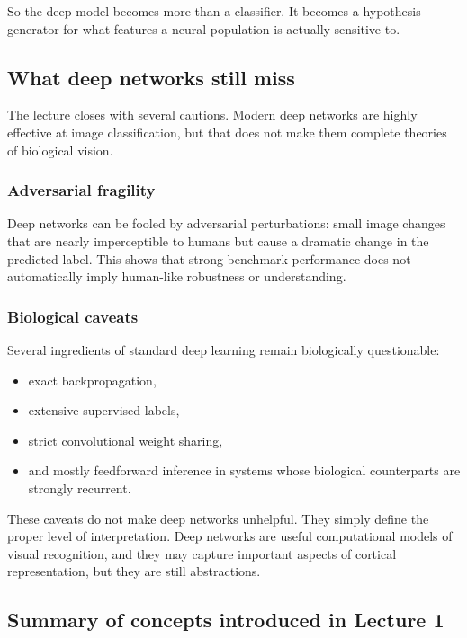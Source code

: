 So the deep model becomes more than a classifier. It becomes a hypothesis generator for what features a neural population is actually sensitive to.

\subsection{What deep networks still miss}

The lecture closes with several cautions. Modern deep networks are highly effective at image classification, but that does not make them complete theories of biological vision.

\subsubsection{Adversarial fragility}

Deep networks can be fooled by adversarial perturbations: small image changes that are nearly imperceptible to humans but cause a dramatic change in the predicted label. This shows that strong benchmark performance does not automatically imply human-like robustness or understanding.

\subsubsection{Biological caveats}

Several ingredients of standard deep learning remain biologically questionable:
\begin{itemize}
    \item exact backpropagation,
    \item extensive supervised labels,
    \item strict convolutional weight sharing,
    \item and mostly feedforward inference in systems whose biological counterparts are strongly recurrent.
\end{itemize}

These caveats do not make deep networks unhelpful. They simply define the proper level of interpretation. Deep networks are useful computational models of visual recognition, and they may capture important aspects of cortical representation, but they are still abstractions.

\subsection{Summary of concepts introduced in Lecture 1}

